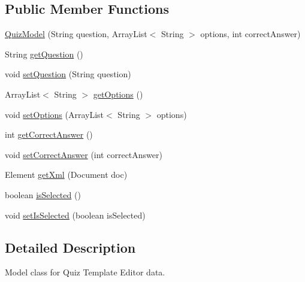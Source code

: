 \subsection*{Public Member Functions}
\begin{DoxyCompactItemize}
\item 
\hyperlink{classorg_1_1buildmlearn_1_1toolkit_1_1templates_1_1QuizModel_ad7ac0923cded5b5ab11c0311098e1aca}{Quiz\-Model} (String question, Array\-List$<$ String $>$ options, int correct\-Answer)
\item 
String \hyperlink{classorg_1_1buildmlearn_1_1toolkit_1_1templates_1_1QuizModel_aefecb799e3e7738989a107f559dd44b8}{get\-Question} ()
\item 
void \hyperlink{classorg_1_1buildmlearn_1_1toolkit_1_1templates_1_1QuizModel_a3d8ef7cb3104f83ff7ed8ee4fcb94c80}{set\-Question} (String question)
\item 
Array\-List$<$ String $>$ \hyperlink{classorg_1_1buildmlearn_1_1toolkit_1_1templates_1_1QuizModel_a836e96e8dafbb46c95630d03ec6e2775}{get\-Options} ()
\item 
void \hyperlink{classorg_1_1buildmlearn_1_1toolkit_1_1templates_1_1QuizModel_a438e25e521d193025952788493b81b5a}{set\-Options} (Array\-List$<$ String $>$ options)
\item 
int \hyperlink{classorg_1_1buildmlearn_1_1toolkit_1_1templates_1_1QuizModel_ad0093665496e473a794700ef0d0b304b}{get\-Correct\-Answer} ()
\item 
void \hyperlink{classorg_1_1buildmlearn_1_1toolkit_1_1templates_1_1QuizModel_a4d774c397860e94d712c89ad004f8d3d}{set\-Correct\-Answer} (int correct\-Answer)
\item 
Element \hyperlink{classorg_1_1buildmlearn_1_1toolkit_1_1templates_1_1QuizModel_ab40e946399a45e02e3c20d2dacc4bf0a}{get\-Xml} (Document doc)
\item 
boolean \hyperlink{classorg_1_1buildmlearn_1_1toolkit_1_1templates_1_1QuizModel_ac076dad02a8b2fd2cd3437b76d4291a3}{is\-Selected} ()
\item 
void \hyperlink{classorg_1_1buildmlearn_1_1toolkit_1_1templates_1_1QuizModel_aee131789e4b61f477436104d543f95d2}{set\-Is\-Selected} (boolean is\-Selected)
\end{DoxyCompactItemize}


\subsection{Detailed Description}
Model class for Quiz Template Editor data. 

